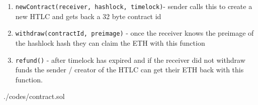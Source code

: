 \begin{enumerate}
	\item \texttt{newContract(receiver, hashlock, timelock)}- sender calls this to create a new HTLC and gets back a 32 byte contract id
	\item \texttt{withdraw(contractId, preimage)} - once the receiver knows the preimage of the hashlock hash they can claim the ETH with this function
	\item \texttt{refund()} - after timelock has expired and if the receiver did not withdraw funds the sender / creator of the HTLC can get their ETH back with this function.
\end{enumerate}

\begin{lstinputlisting}[language=Solidity, 
						firstline=20, 
						lastline=50, 
						caption= Ethereum micro-payment channel -- Machinomy]{./codes/contract.sol}
	
\end{lstinputlisting}



